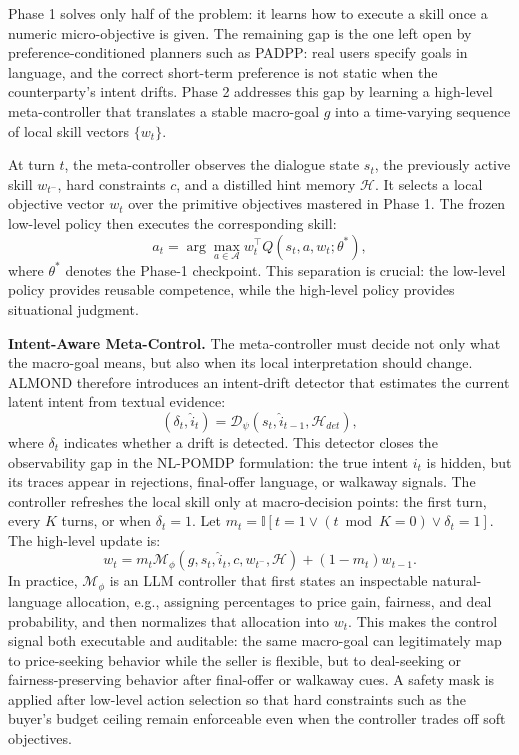 \documentclass[conference]{IEEEtran}
\begin{document}
Phase 1 solves only half of the problem: it learns how to execute a skill once a
numeric micro-objective is given. The remaining gap is the one left open by
preference-conditioned planners such as PADPP: real users specify goals in
language, and the correct short-term preference is not static when the
counterparty's intent drifts. Phase 2 addresses this gap by learning a
high-level meta-controller that translates a stable macro-goal $g$ into a
time-varying sequence of local skill vectors $\{w_t\}$.

At turn $t$, the meta-controller observes the dialogue state $s_t$, the
previously active skill $w_{t^-}$, hard constraints $c$, and a distilled hint
memory $\mathcal{H}$. It selects a local objective vector $w_t$ over the
primitive objectives mastered in Phase 1. The frozen low-level policy then
executes the corresponding skill:
\begin{equation}
    a_t = \arg\max_{a \in \mathcal{A}} w_t^{\top} Q(s_t, a, w_t; \theta^*),
\end{equation}
where $\theta^*$ denotes the Phase-1 checkpoint. This separation is crucial:
the low-level policy provides reusable competence, while the high-level policy
provides situational judgment.

\textbf{Intent-Aware Meta-Control.}
The meta-controller must decide not only what the macro-goal means, but also
when its local interpretation should change. ALMOND therefore introduces an
intent-drift detector that estimates the current latent intent from textual
evidence:
\begin{equation}
    (\delta_t, \hat{i}_t)=
    \mathcal{D}_{\psi}(s_t,\hat{i}_{t-1},\mathcal{H}_{det}),
\end{equation}
where $\delta_t$ indicates whether a drift is detected. This detector closes the
observability gap in the NL-POMDP formulation: the true intent $i_t$ is hidden,
but its traces appear in rejections, final-offer language, or walkaway signals.
The controller refreshes the local skill only at macro-decision points: the
first turn, every $K$ turns, or when $\delta_t=1$. Let
$m_t=\mathbb{I}[t=1 \vee (t \bmod K=0) \vee \delta_t=1]$. The high-level update
is:
\begin{equation}
    w_t = m_t\mathcal{M}_{\phi}(g,s_t,\hat{i}_t,c,w_{t^-},\mathcal{H})
    +(1-m_t)w_{t-1}.
\end{equation}
In practice, $\mathcal{M}_{\phi}$ is an LLM controller that first states an
inspectable natural-language allocation, e.g., assigning percentages to price
gain, fairness, and deal probability, and then normalizes that allocation into
$w_t$. This makes the control signal both executable and auditable: the same
macro-goal can legitimately map to price-seeking behavior while the seller is
flexible, but to deal-seeking or fairness-preserving behavior after final-offer
or walkaway cues. A safety mask is applied after low-level action selection so
that hard constraints such as the buyer's budget ceiling remain enforceable
even when the controller trades off soft objectives.
\end{document}
